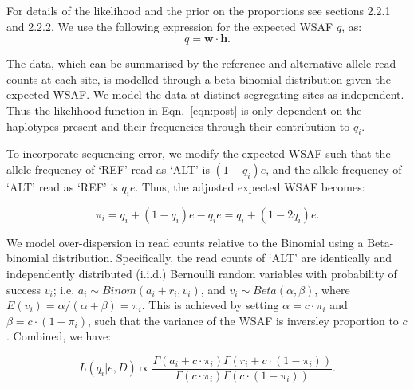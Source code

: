 \documentclass[9pt,lineno]{elife}
\begin{document}
\noindent For details of the likelihood and the prior on the proportions see \citet{Zhu2017} sections 2.2.1 and 2.2.2. We use the following expression for the expected WSAF $q$, as:
\begin{equation}
q = \mathbf{w}\cdot\mathbf{h}.\label{eqn:qij_full_sum}
\end{equation}



\noindent The data, which can be summarised by the reference and alternative allele read counts at each site, is modelled through a beta-binomial distribution given the expected WSAF.  We model the data at distinct segregating sites as independent.  Thus the likelihood function  in Eqn.~\eqref{eqn:post} is only dependent on the haplotypes present and their frequencies through their contribution to $q_{i}$.


To incorporate sequencing error, we modify the expected WSAF such that the allele frequency of `REF' read as `ALT' is $(1 - q_i)e$, and the allele frequency of `ALT' read as `REF' is $q_ie$. Thus, the adjusted expected WSAF becomes:

\begin{equation}
\pi_i = q_i + (1 - q_i)e - q_ie = q_i + (1 - 2q_i)e.\label{eqn:adj_q}
\end{equation}

\noindent We model over-dispersion in read counts relative to the Binomial using a Beta-binomial distribution. Specifically, the read counts of `ALT' are identically and independently distributed (i.i.d.) Bernoulli random variables with probability of success $v_i$; i.e. $a_i \sim Binom(a_i + r_i, v_i)$, and $v_i \sim Beta(\alpha, \beta)$, where $E(v_i) = \alpha/(\alpha+\beta) = \pi_{i}$. This is achieved by setting $\alpha = c\cdot \pi_{i} $ and $\beta = c\cdot (1-\pi_{i})$, such that the variance of the WSAF is inversley proportion to $c$.  Combined, we have:

\begin{equation}
L(q_{i}| e, D) \propto \frac{\Gamma(a_i + c\cdot \pi_{i}) \Gamma(r_i + c\cdot (1-\pi_{i}))}{\Gamma(c\cdot \pi_{i})\Gamma(c\cdot (1-\pi_{i}))}. \label{eqn:llk}
\end{equation}


\end{document}

